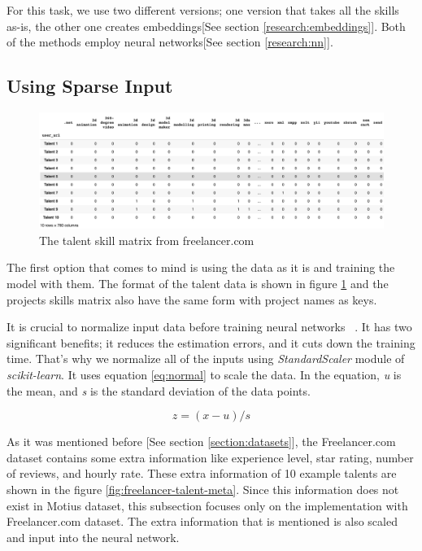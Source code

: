 For this task, we use two different versions; one version that takes all the skills as-is, the other one creates embeddings[See section \ref{research:embeddings}]. Both of the methods employ neural networks[See section \ref{research:nn}].


\subsection{Using Sparse Input}

\begin{figure}[htp]
	\centering
	\includegraphics[width=\textwidth]{figures/FreelancerTalentSkillsMatrix.png}
	\caption{The talent skill matrix from freelancer.com}
	\label{fig:freelancer-talent-matrix}
\end{figure}

The first option that comes to mind is using the data as it is and training the model with them. The format of the talent data is shown in figure \ref{fig:freelancer-talent-matrix} and the projects skills matrix also have the same form with project names as keys.


It is crucial to normalize input data before training neural networks ~\parencite{sola1997importance}. It has two significant benefits; it reduces the estimation errors, and it cuts down the training time. That's why we normalize all of the inputs using \textit{StandardScaler} module of \textit{scikit-learn}. It uses equation  \eqref{eq:normal} to scale the data. In the equation, \textit{u} is the mean, and \textit{s} is the standard deviation of the data points.

\begin{equation}
z = (x - u) / s
\label{eq:normal}
\end{equation}


As it was mentioned before [See section \ref{section:datasets}], the Freelancer.com dataset contains some extra information like experience level, star rating, number of reviews, and hourly rate. These extra information of 10 example talents are shown in the figure \ref{fig:freelancer-talent-meta}. Since this information does not exist in Motius dataset, this subsection focuses only on the implementation with Freelancer.com dataset. The extra information that is mentioned is also scaled and input into the neural network. 


